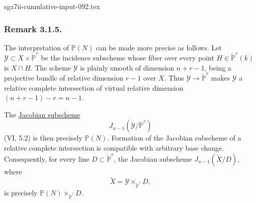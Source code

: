 \begin{filecontents*}{sga7ii-cumulative-input-092.tex}
\subsubsection*{Remark 3.1.5.}
The interpretation of $\mathbb P(N)$ can be made more precise as
follows.  Let
$\mathcal Y\subset X\times\check{\mathbb P}^{r}$ be the incidence
subscheme whose fiber over every point
$H\in\check{\mathbb P}^{r}(k)$ is $X\cap H$.  The scheme $\mathcal Y$
is plainly smooth of dimension $n+r-1$, being a projective bundle of
relative dimension $r-1$ over $X$.  Thus
$\mathcal Y\to\check{\mathbb P}^{r}$ makes $\mathcal Y$ a relative
complete intersection of virtual relative dimension
$(n+r-1)-r=n-1$.

The \underline{Jacobian subscheme}
\[
J_{n-1}(\mathcal Y/\check{\mathbb P}^{r})
\]
(VI, 5.2) is then precisely $\mathbb P(N)$.  Formation of the
Jacobian subscheme of a relative complete intersection is compatible
with arbitrary base change.  Consequently, for every line
$D\subset\check{\mathbb P}^{r}$, the Jacobian subscheme
$J_{n-1}(\widetilde X/D)$, where
\[
\widetilde X=\mathcal Y\times_{\check{\mathbb P}^{r}}D,
\]
is precisely
$\mathbb P(N)\times_{\check{\mathbb P}^{r}}D$.
\end{filecontents*}
